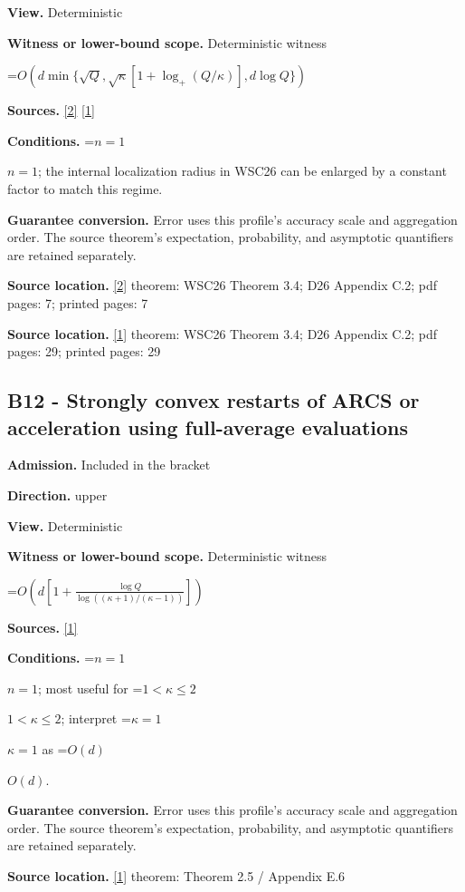 \documentclass[10pt,a4paper]{article}
\newcommand{\AtlasMath}[1]{\par\begingroup\centering\setbox0=\hbox{$\displaystyle #1$}\ifdim\wd0>1.4\linewidth\typeout{ATLAS WIDE FORMULA: \the\wd0}\fi\ifdim\wd0>\linewidth\resizebox{\linewidth}{!}{\box0}\else\box0\fi\par\endgroup}
\newcommand{\AtlasInlineMath}[1]{\begingroup\setbox0=\hbox{$#1$}\ifdim\wd0>.4\linewidth\endgroup\AtlasMath{#1}\else\endgroup$#1$\fi}
\begin{document}
\textbf{View.} Deterministic

\textbf{Witness or lower-bound scope.} Deterministic witness

\AtlasMath{O\!\left(d\min\{\sqrt Q,\sqrt\kappa[1+\log_+(Q/\kappa)],d\log Q\}\right)}
\textbf{Sources.} \href{https://arxiv.org/pdf/2609.18728v2}{[2]} \href{https://arxiv.org/html/2610.00345v1}{[1]}

\textbf{Conditions.} \AtlasInlineMath{n=1}; the internal localization radius in WSC26 can be enlarged by a constant factor to match this regime.

\textbf{Guarantee conversion.} Error uses this profile's accuracy scale and aggregation order. The source theorem's expectation, probability, and asymptotic quantifiers are retained separately.

\textbf{Source location.} \href{https://arxiv.org/pdf/2609.18728v2}{[2]} theorem: WSC26 Theorem 3.4; D26 Appendix C.2; pdf pages: 7; printed pages: 7

\textbf{Source location.} \href{https://arxiv.org/html/2610.00345v1}{[1]} theorem: WSC26 Theorem 3.4; D26 Appendix C.2; pdf pages: 29; printed pages: 29

\subsection{B12 - Strongly convex restarts of ARCS or acceleration using full-average evaluations}
\textbf{Admission.} Included in the bracket

\textbf{Direction.} upper

\textbf{View.} Deterministic

\textbf{Witness or lower-bound scope.} Deterministic witness

\AtlasMath{O\!\left(d\left[1+\frac{\log Q}{\log((\kappa+1)/(\kappa-1))}\right]\right)}
\textbf{Sources.} \href{https://arxiv.org/html/2610.00345v1}{[1]}

\textbf{Conditions.} \AtlasInlineMath{n=1}; most useful for \AtlasInlineMath{1<\kappa\le2}; interpret \AtlasInlineMath{\kappa=1} as \AtlasInlineMath{O(d)}.

\textbf{Guarantee conversion.} Error uses this profile's accuracy scale and aggregation order. The source theorem's expectation, probability, and asymptotic quantifiers are retained separately.

\textbf{Source location.} \href{https://arxiv.org/html/2610.00345v1}{[1]} theorem: Theorem 2.5 / Appendix E.6
\end{document}
